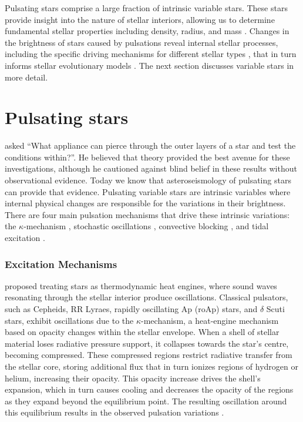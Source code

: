 Pulsating stars comprise a large fraction of intrinsic variable stars. These stars provide insight into the nature of stellar interiors, allowing us to determine fundamental stellar properties including density, radius, and mass \citep{chaplin_asteroseismic_2013, aerts_asteroseismology_2010, basu_asteroseismic_2017}. Changes in the brightness of stars caused by pulsations reveal internal stellar processes, including the specific driving mechanisms for different stellar types \cite[eg.][and references therein]{lenain_epsilon-mechanism_2006, welsh_koi-54_2011, aerts_asteroseismology_2010}, that in turn informs stellar evolutionary models \cite[eg.][]{garcia_observational_2015, houdek_surface_2017}. The next section discusses variable stars in more detail.

\section{Pulsating stars}

\cite{Eddington_internal_1926} asked ``What appliance can pierce through the outer layers of a star and test the conditions within?''. He believed that theory provided the best avenue for these investigations, although he cautioned against blind belief in these results without observational evidence. Today we know that asteroseismology of pulsating stars can provide that evidence. Pulsating variable stars are intrinsic variables where internal physical changes are responsible for the variations in their brightness. There are four main pulsation mechanisms that drive these intrinsic variations: the $\kappa$-mechanism \citep{eddington_cause_1941}, stochastic oscillations \citep{unno_stellar_1967}, convective blocking \citep{pesnell_new_1987}, and tidal excitation \citep{kumar_tidal_1995}.

\subsubsection{Excitation Mechanisms}

\cite{eddington_pulsation_1917} proposed treating stars as thermodynamic heat engines, where sound waves resonating through the stellar interior produce oscillations. Classical pulsators, such as Cepheids, RR Lyraes, rapidly oscillating Ap (roAp) stars, and $\delta$ Scuti stars, exhibit oscillations due to the $\kappa$-mechanism, a heat-engine mechanism based on opacity changes within the stellar envelope. When a shell of stellar material loses radiative pressure support, it collapses towards the star's centre, becoming compressed. These compressed regions restrict radiative transfer from the stellar core, storing additional flux \citep{zhevakin_physical_1963} that in turn ionizes regions of hydrogen or helium, increasing their opacity. This opacity increase drives the shell's expansion, which in turn causes cooling and decreases the opacity of the regions as they expand beyond the equilibrium point. The resulting oscillation around this equilibrium results in the observed pulsation variations \citep{king_pulsating_1968}.

